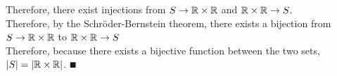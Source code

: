 \documentclass[a4paper, 11pt]{report}
\begin{document}
Therefore, there exist injections from $S\to\mathbb{R}\times\mathbb{R}$ and $\mathbb{R}\times\mathbb{R}\to S$. \\
Therefore, by the Schr\"oder-Bernstein theorem, there exists a bijection from $S\to\mathbb{R}\times\mathbb{R}$ to $\mathbb{R}\times\mathbb{R}\to S$ \\
Therefore, because there exists a bijective function between the two sets, $\left| S \right| = \left| \mathbb{R}\times\mathbb{R} \right|$. $\QED$
\end{document}

